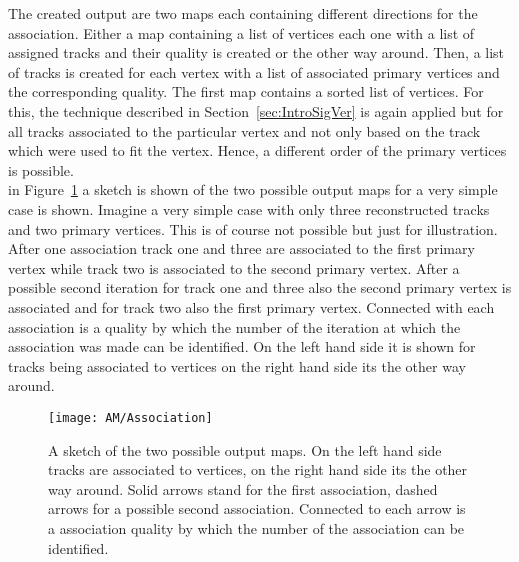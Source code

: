 The created output are two maps each containing different directions for the association. Either a map containing a list of vertices each one with a list of assigned tracks and their quality is created or the other way around. Then, a list of tracks is created for each vertex with a list of associated primary vertices and the corresponding quality. The first map contains a sorted list of vertices. For this, the technique described in Section~\ref{sec:IntroSigVer} is again applied but for all tracks associated to the particular vertex and not only based on the track which were used to fit the vertex. Hence, a different order of the primary vertices is possible.\\
in Figure~\ref{plot:AMOutput} a sketch is shown of the two possible output maps for a very simple case is shown. Imagine a very simple case with only three reconstructed tracks and two primary vertices. This is of course not possible but just for illustration. After one association track one and three are associated to the first primary vertex while track two is associated to the second primary vertex. After a possible second iteration for track one and three also the second primary vertex is associated and for track two also the first primary vertex. Connected with each association is a quality by which the number of the iteration at which the association was made can be identified. On the left hand side it is shown for tracks being associated to vertices on the right hand side its the other way around.

\begin{figure}[!ht]
  \centering
  \texttt{[image: AM/Association]}
  \caption[Sketch of the two different output maps]{A sketch of the two possible output maps. On the left hand side tracks are associated to vertices, on the right hand side its the other way around. Solid arrows stand for the first association, dashed arrows for a possible second association. Connected to each arrow is a association quality by which the number of the association can be identified. \label{plot:AMOutput}}
\end{figure}
